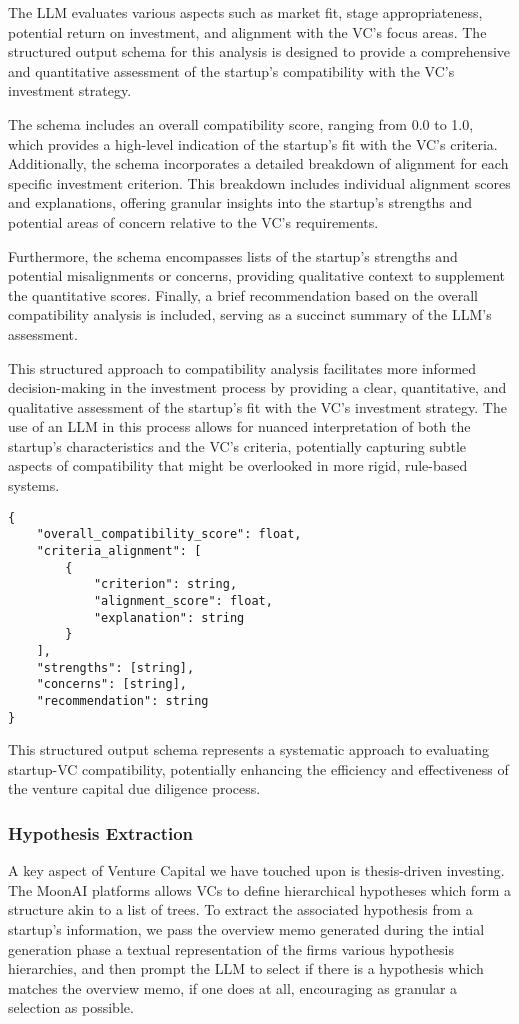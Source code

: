 \documentclass[a4paper, oneside]{discothesis}
\begin{document}
The LLM evaluates various aspects such as market fit, stage appropriateness, potential return on investment, and alignment with the VC's focus areas. The structured output schema for this analysis is designed to provide a comprehensive and quantitative assessment of the startup's compatibility with the VC's investment strategy.

The schema includes an overall compatibility score, ranging from 0.0 to 1.0, which provides a high-level indication of the startup's fit with the VC's criteria. Additionally, the schema incorporates a detailed breakdown of alignment for each specific investment criterion. This breakdown includes individual alignment scores and explanations, offering granular insights into the startup's strengths and potential areas of concern relative to the VC's requirements.

Furthermore, the schema encompasses lists of the startup's strengths and potential misalignments or concerns, providing qualitative context to supplement the quantitative scores. Finally, a brief recommendation based on the overall compatibility analysis is included, serving as a succinct summary of the LLM's assessment.

This structured approach to compatibility analysis facilitates more informed decision-making in the investment process by providing a clear, quantitative, and qualitative assessment of the startup's fit with the VC's investment strategy. The use of an LLM in this process allows for nuanced interpretation of both the startup's characteristics and the VC's criteria, potentially capturing subtle aspects of compatibility that might be overlooked in more rigid, rule-based systems.

\begin{verbatim}
{
    "overall_compatibility_score": float,
    "criteria_alignment": [
        {
            "criterion": string,
            "alignment_score": float,
            "explanation": string
        }
    ],
    "strengths": [string],
    "concerns": [string],
    "recommendation": string
}
\end{verbatim}

This structured output schema represents a systematic approach to evaluating startup-VC compatibility, potentially enhancing the efficiency and effectiveness of the venture capital due diligence process.

\subsubsection{Hypothesis Extraction}
A key aspect of Venture Capital we have touched upon is thesis-driven investing. The MoonAI platforms allows VCs to define hierarchical hypotheses which form a structure akin to a list of trees. To extract the associated hypothesis from a startup's information, we pass the overview memo generated during the intial generation phase a textual representation of the firms various hypothesis hierarchies, and then prompt the LLM to select if there is a hypothesis which matches the overview memo, if one does at all, encouraging as granular a selection as possible. 
\end{document}
